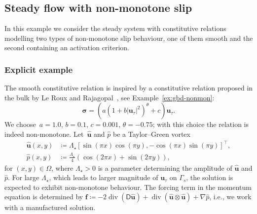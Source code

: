 \documentclass[reqno,a4paper]{amsart}
\def\tens#1{\pmb{\mathsf{#1}}}
\def\vec#1{\boldsymbol{#1}}
\def\diver{\mathop{\mathrm{div}}\nolimits} %
\def\bu{\vec{u}}
\def\bsigma{\vec{\sigma}}
\def\BD{\tens{D}}
\begin{document}
	
	\subsection{Steady flow with non-monotone slip}
	\label{sec:num-exp-1}
	
	In this example we consider the steady system with constitutive relations modelling two types of non-monotone slip behaviour, one of them smooth and the second containing an activation criterion. 

 \subsubsection{Explicit example} 
	The smooth constitutive relation is inspired by a constitutive relation proposed in the bulk by Le Roux and Rajagopal~\cite{LeRoux2013}, see Example~\ref{ex:gbd-nonmon}: 
	\begin{equation}\label{eq:non-monotone-slip}
		\bsigma = \left(a (1+ b|\bu_\tau|^2)^\theta + c \right)\bu_\tau.
	\end{equation}
	We choose~$a=1.0$, $b=0.1$, $c=0.001$, $\theta=-0.75$; with this choice the relation is indeed non-monotone. 
	Let~$\hat{\bu}$ and $\hat{p}$ be a Taylor--Green vortex
	\begin{equation}\label{eq:taylor_green}
		\begin{aligned}
			\hat{\bu}(x,y) &\coloneqq \Lambda_\star [\sin(\pi x) \cos(\pi y), - \cos(\pi x) \sin(\pi y)]^\top, \\
			\hat{p}(x,y) &\coloneqq  \frac{\Lambda_\star}{4}(\cos(2\pi x) + \sin(2 \pi y)),
		\end{aligned}
	\end{equation}
	for $(x,y)\in \Omega$, where $\Lambda_\star>0$ is a parameter determining the amplitude of $\hat{\bu}$ and $\hat{p}$. 
	For large $\Lambda_\star$, which leads to larger magnitude of $\bu_\tau$ on $\Gamma_s$, the solution is expected to exhibit non-monotone behaviour.
	The forcing term in the momentum equation is determined by $\bm{f} \coloneqq - 2\diver( \BD\hat{\bu}) + \diver(\hat{\bu}\otimes \hat{\bu}) + \nabla \hat{p}$, i.e., we work with  a manufactured solution. 
	
\end{document}
